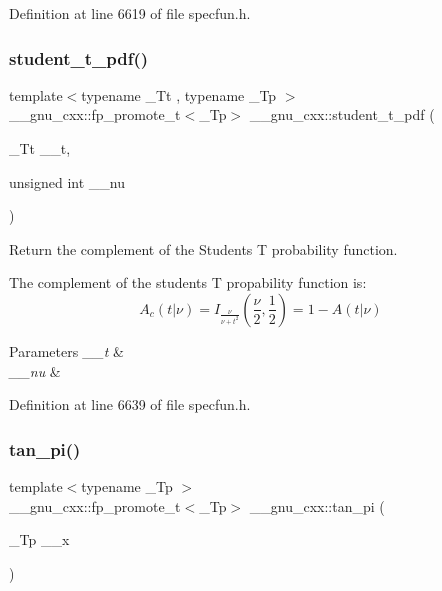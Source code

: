 Definition at line 6619 of file specfun.\+h.

\mbox{\label{group__gnu__math__spec__func_ga95a4c03cf0a8104e9a15a35acfe5fb3a}} 
\subsubsection{\texorpdfstring{student\+\_\+t\+\_\+pdf()}{student\_t\_pdf()}}
{\footnotesize\ttfamily template$<$typename \+\_\+\+Tt , typename \+\_\+\+Tp $>$ \\
\+\_\+\+\_\+gnu\+\_\+cxx\+::fp\+\_\+promote\+\_\+t$<$\+\_\+\+Tp$>$ \+\_\+\+\_\+gnu\+\_\+cxx\+::student\+\_\+t\+\_\+pdf (\begin{DoxyParamCaption}\item[{\+\_\+\+Tt}]{\+\_\+\+\_\+t,  }\item[{unsigned int}]{\+\_\+\+\_\+nu }\end{DoxyParamCaption})}



Return the complement of the Students T probability function. 

The complement of the students T propability function is\+: \[ A_c(t|\nu) = I_{\frac{\nu}{\nu + t^2}}(\frac{\nu}{2}, \frac{1}{2}) = 1 - A(t|\nu) \]


\begin{DoxyParams}{Parameters}
{\em \+\_\+\+\_\+t} & \\
\hline
{\em \+\_\+\+\_\+nu} & \\
\hline
\end{DoxyParams}


Definition at line 6639 of file specfun.\+h.

\mbox{\label{group__gnu__math__spec__func_ga12855bd62fe6a955ef0d1d5e92c85ba9}} 
\subsubsection{\texorpdfstring{tan\+\_\+pi()}{tan\_pi()}}
{\footnotesize\ttfamily template$<$typename \+\_\+\+Tp $>$ \\
\+\_\+\+\_\+gnu\+\_\+cxx\+::fp\+\_\+promote\+\_\+t$<$\+\_\+\+Tp$>$ \+\_\+\+\_\+gnu\+\_\+cxx\+::tan\+\_\+pi (\begin{DoxyParamCaption}\item[{\+\_\+\+Tp}]{\+\_\+\+\_\+x }\end{DoxyParamCaption})\hspace{0.3cm}{\ttfamily [inline]}}

